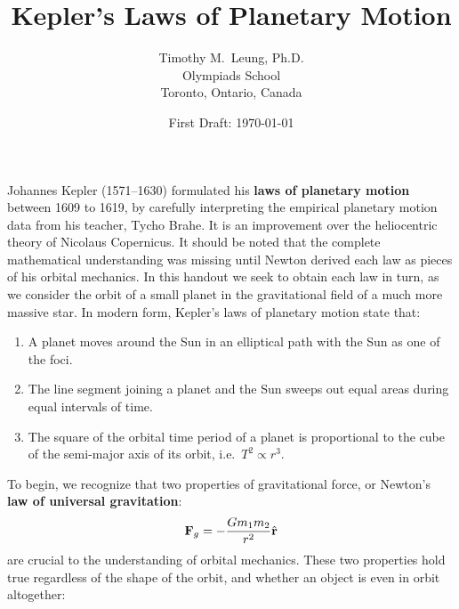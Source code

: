 \documentclass[11pt]{article}
\title{Kepler's Laws of Planetary Motion}
\author{Timothy M.\ Leung, Ph.D.\\
  Olympiads School\\ Toronto, Ontario, Canada}
\date{First Draft: \today}
\newcommand{\mb}[1]{
  \ensuremath\mathbf{#1}
}
\begin{document}
\maketitle
Johannes Kepler (1571--1630) formulated his \textbf{laws of planetary motion}
between 1609 to 1619, by carefully interpreting the empirical planetary motion
data from his teacher, Tycho Brahe. It is an improvement over the heliocentric
theory of Nicolaus Copernicus. It should be noted that the complete mathematical
understanding was missing until Newton derived each law as pieces of his
orbital mechanics. In this handout we seek to obtain each law in turn, as we
consider the orbit of a small planet in the gravitational field of a much
more massive star. In modern form, Kepler's laws of planetary motion state
that:
\begin{enumerate}[leftmargin=18pt,noitemsep,topsep=0pt]
\item A planet moves around the Sun in an elliptical path with the Sun as one
  of the foci.
\item The line segment joining a planet and the Sun sweeps out equal areas
  during equal intervals of time.
\item The square of the orbital time period of a planet is proportional to the
  cube of the semi-major axis of its orbit, i.e.\ $T^2\propto r^3$.
\end{enumerate}
To begin, we recognize that two properties of gravitational force, or Newton's
\textbf{law of universal gravitation}:
\begin{equation}
  \mb{F}_g=-\frac{Gm_1m_2}{r^2}\hat{\mb{r}}
\end{equation}
are crucial to the
understanding of orbital mechanics. These two properties hold true regardless
of the shape of the orbit, and whether an object is even in orbit altogether:
\end{document}

